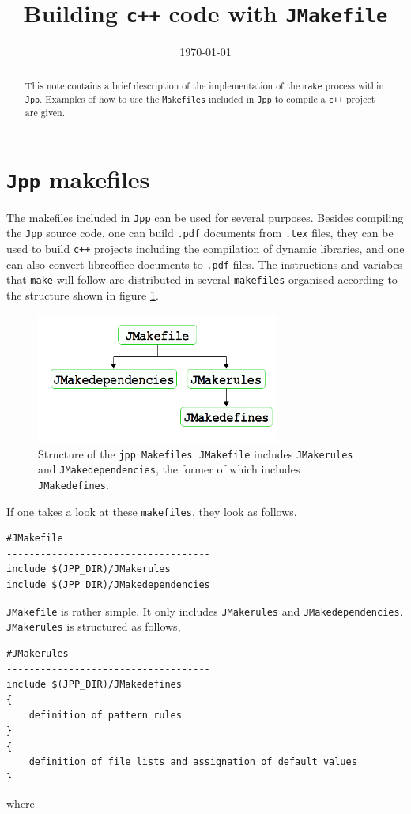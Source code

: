 \documentclass[t]{article}
\title{Building {\tt c++} code with {\tt JMakefile}}
\author{}
\date{\today}
\begin{document}
\maketitle
\begin{abstract}
This note contains a brief description of the implementation of the {\tt make} process within {\tt Jpp}. Examples of how to use the {\tt Makefiles} included in {\tt Jpp} to compile a {\tt c++} project are given.
\end{abstract}

\section{{\tt Jpp} makefiles}
The makefiles included in {\tt Jpp} can be used for several purposes. Besides compiling the {\tt Jpp} source code, one can build {\tt .pdf} documents from {\tt .tex} files, they can be used to build {\tt c++} projects including the compilation of dynamic libraries, and one can also convert libreoffice documents to {\tt .pdf} files. The instructions and variabes that {\tt make} will follow are distributed in several {\tt makefiles} organised according to the structure shown in figure \ref{fig:JMake_structure}.
\begin{figure}[h]
\center
\includegraphics[width=8cm]{./plots/JMake_structure}
\caption{Structure of the {\tt jpp Makefiles}. {\tt JMakefile} includes {\tt JMakerules} and {\tt JMakedependencies}, the former of which includes {\tt JMakedefines}.}\label{fig:JMake_structure}
\end{figure}
If one takes a look at these {\tt makefiles}, they look as follows. 

\begin{lstlisting}
#JMakefile
------------------------------------
include $(JPP_DIR)/JMakerules
include $(JPP_DIR)/JMakedependencies
\end{lstlisting}
{\tt JMakefile} is rather simple. It only includes {\tt JMakerules} and {\tt JMakedependencies}. {\tt JMakerules} is structured as follows,
\begin{lstlisting}
#JMakerules
------------------------------------
include $(JPP_DIR)/JMakedefines
{
	definition of pattern rules
}
{
	definition of file lists and assignation of default values
}
\end{lstlisting}
where 
\end{document}
